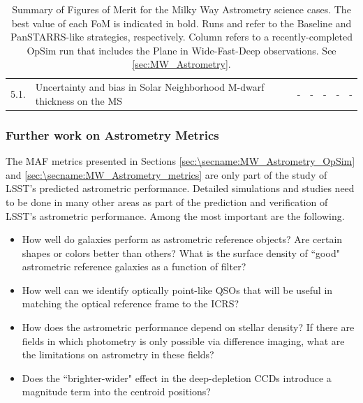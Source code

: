 \begin{table}
\begin{tabular}{l|p{4.8cm}|p{1.1cm}|p{1.1cm}|p{1.1cm}|c|p{3.5cm}}
    5.1. & \footnotesize{Uncertainty and bias in Solar Neighborhood M-dwarf thickness on the MS}  & - & - & - & - &  - \\
\end{tabular}
\caption{Summary of Figures of Merit for the Milky Way Astrometry science cases. The best value of each FoM is indicated in bold. Runs  and  refer to the Baseline and PanSTARRS-like strategies, respectively. Column  refers to a recently-completed OpSim run that includes the Plane in Wide-Fast-Deep observations. See \autoref{sec:MW_Astrometry}.}
\label{tab_SummaryMWAstrometry}
\end{table}




\subsubsection{Further work on Astrometry Metrics}

The MAF metrics presented in Sections \ref{sec:\secname:MW_Astrometry_OpSim} and \ref{sec:\secname:MW_Astrometry_metrics} are only part of the
study of LSST's predicted astrometric performance.  Detailed simulations
and studies need to be done in many other areas as part of the
prediction and verification of LSST's astrometric performance.  Among
the most important are the following.
\begin{itemize}
\item How well do galaxies perform as astrometric reference objects? Are certain shapes or colors better than others? What is the
surface density of ``good" astrometric reference galaxies as a function of filter?
\item How well can we identify optically point-like QSOs that will be useful in matching the optical reference frame to the ICRS?
\item How does the astrometric performance depend on stellar density? If there are fields in which photometry is only possible via difference imaging, what are the limitations
on astrometry in these fields?
\item Does the ``brighter-wider" effect in the deep-depletion CCDs introduce a magnitude term into the centroid positions?
\end{itemize}

